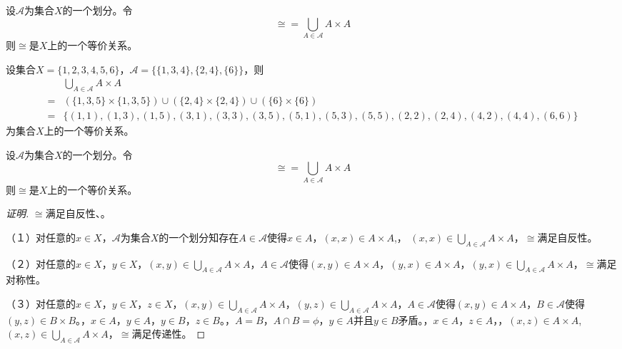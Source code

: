 \documentclass{beamer}
\begin{document}
\begin{CJK*}{UTF8}{gbsn}
\begin{frame}
\end{frame}
\begin{frame}
  \begin{Thm}
    设$\mathscr{A}$为集合$X$的一个划分。令
    \begin{equation*}
      \cong = \bigcup_{A\in \mathscr{A}}A\times A
    \end{equation*}
    则$\cong$是$X$上的一个等价关系。
  \end{Thm}
  \pause
  设集合$X=\{1,2,3,4,5,6\}$，$\mathscr{A}=\{\{1,3,4\},\{2,4\},\{6\}\}$，则
  \begin{equation*}
    \begin{split}
      &\bigcup_{A\in \mathscr{A}}A\times A\\
      =&(\{1,3,5\} \times \{1,3,5\}) \cup (\{2,4\}\times \{2,4\}) \cup (\{6\}\times \{6\})\\
      =&\{(1,1),(1,3),(1,5),(3,1),(3,3),(3,5),(5,1),(5,3),(5,5),(2,2),(2,4),(4,2),(4,4),(6,6)\}
    \end{split}
  \end{equation*}
  为集合$X$上的一个等价关系。

\end{frame}

\begin{frame}
  \small
  \begin{Thm6.3}
    设$\mathscr{A}$为集合$X$的一个划分。令
    \begin{equation*}
      \cong = \bigcup_{A\in \mathscr{A}}A\times A
    \end{equation*}
    则$\cong$是$X$上的一个等价关系。
  \end{Thm6.3}
  \pause
  \begin{proof}[证明]\justifying\let\raggedright\justifying
    $\cong$满足自反性、。

    \pause（１）对任意的$x\in X$，$\mathscr{A}$为集合$X$的一个划分知存在$A\in \mathscr{A}$使得$x\in A$，$(x,x) \in A\times A$,， \pause$(x,x)\in \bigcup_{A\in \mathscr{A}}A\times A$，$\cong$满足自反性。

    \pause（２）对任意的$x\in X$，\pause$y\in X$，$(x,y)\in \bigcup_{A\in \mathscr{A}}A\times A$，$A\in \mathscr{A}$使得$(x,y)\in A\times A$，$(y,x)\in A\times A$，$(y,x)\in \bigcup_{A\in \mathscr{A}}A\times A$，$\cong$满足对称性。

  \pause  （３）对任意的$x\in X$，\pause$y\in X$，\pause$z\in X$，$(x,y)\in \bigcup_{A\in \mathscr{A}}A\times A$，$(y,z)\in \bigcup_{A\in \mathscr{A}}A\times A$，$A\in \mathscr{A}$使得$(x,y)\in A\times A$，$B\in \mathscr{A}$使得$(y,z)\in B\times B$。，\pause$x\in A$，\pause$y\in A$，\pause$y\in B$，\pause$z\in B$。，$A=B$，$A\cap B=\phi$，$y\in A$并且$y\in B$矛盾。，\pause$x\in A$，\pause$z\in A$，，\pause$(x,z)\in A\times A$,$(x,z)\in \bigcup_{A\in \mathscr{A}}A\times A$，$\cong$满足传递性。
    

\end{proof}
\end{frame}
\end{CJK*}
\end{document}
